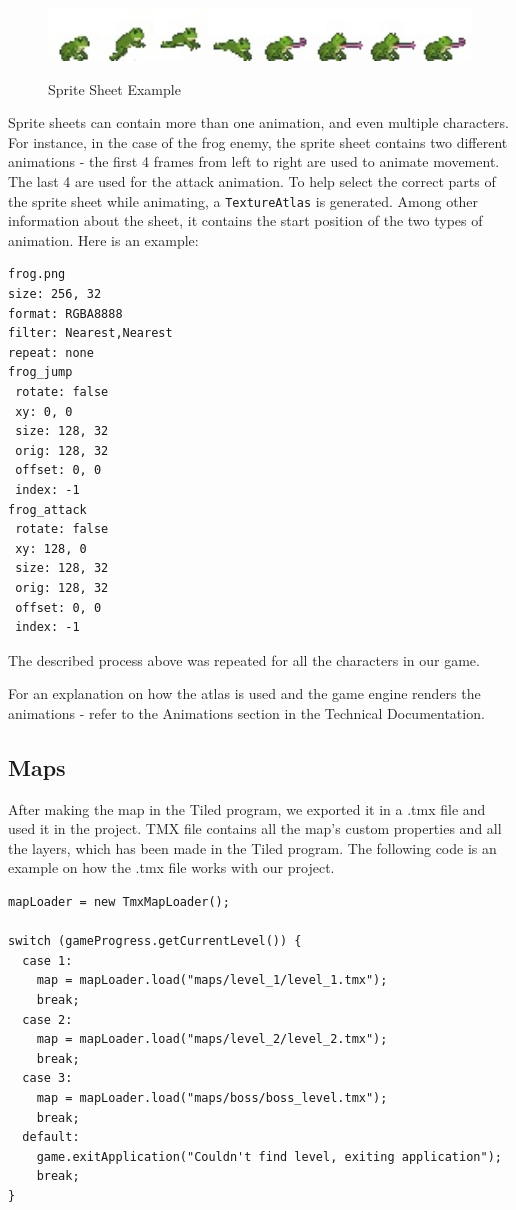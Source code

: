\documentclass[12p]{article}
\begin{document}
\begin{figure}[ht]
  \center
  \includegraphics[width=1\textwidth]{Documentation/frog.jpg}
  \label{SpriteSheetExample}
  \caption{Sprite Sheet Example}
\end{figure}

Sprite sheets can contain more than one animation, and even multiple characters. For instance, in the case of the frog enemy, the sprite sheet contains two different animations - the first 4 frames from left to right are used to animate movement. The last 4 are used for the attack animation. To help select the correct parts of the sprite sheet while animating, a \texttt{TextureAtlas} is generated. Among other information about the sheet, it contains the start position of the two types of animation. Here is an example:

\begin{verbatim}
frog.png
size: 256, 32
format: RGBA8888
filter: Nearest,Nearest
repeat: none
frog_jump
 rotate: false
 xy: 0, 0
 size: 128, 32
 orig: 128, 32
 offset: 0, 0
 index: -1
frog_attack
 rotate: false
 xy: 128, 0
 size: 128, 32
 orig: 128, 32
 offset: 0, 0
 index: -1
\end{verbatim}

The described process above was repeated for all the characters in our game. 

For an explanation on how the atlas is used and the game engine renders the animations - refer to the Animations section in the Technical Documentation.


\newpage
\subsection{Maps} \label{DocMaps}

After making the map in the Tiled program, we exported it in a .tmx file and used it in the project. TMX file contains all the map’s custom properties and all the layers, which has been made in the Tiled program. The following code is an example on how the .tmx file works with our project.

\begin{verbatim}
mapLoader = new TmxMapLoader();

switch (gameProgress.getCurrentLevel()) {
  case 1:
    map = mapLoader.load("maps/level_1/level_1.tmx");
    break;
  case 2:
    map = mapLoader.load("maps/level_2/level_2.tmx");
    break;
  case 3:
    map = mapLoader.load("maps/boss/boss_level.tmx");
    break;
  default:
    game.exitApplication("Couldn't find level, exiting application");
    break;
}
\end{verbatim}
\end{document}
